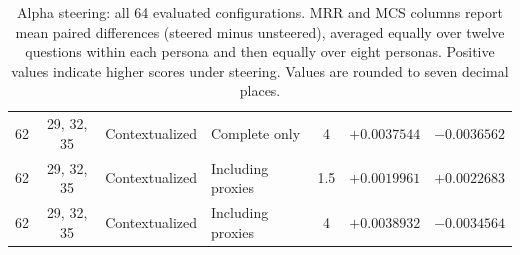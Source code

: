 \begin{table}[p]
\begin{tabular*}{\textwidth}{@{\extracolsep{\fill}}ccllcrr@{}}
62 & 29, 32, 35 & Contextualized & Complete only & 4 & $+0.0037544$ & $-0.0036562$ \\
62 & 29, 32, 35 & Contextualized & Including proxies & 1.5 & $+0.0019961$ & $+0.0022683$ \\
62 & 29, 32, 35 & Contextualized & Including proxies & 4 & $+0.0038932$ & $-0.0034564$ \\
\bottomrule
\end{tabular*}
\caption{Alpha steering: all 64 evaluated configurations. MRR and MCS columns report mean paired differences (steered minus unsteered), averaged equally over twelve questions within each persona and then equally over eight personas. Positive values indicate higher scores under steering. Values are rounded to seven decimal places.}
\label{tab:quantitative-alpha-all}
\end{table}

